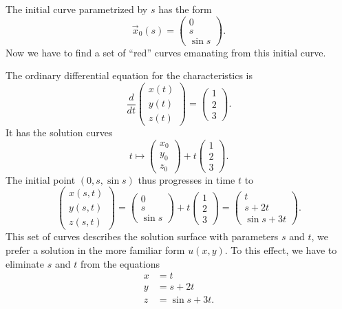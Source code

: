 The initial curve parametrized by $s$ has the form
\[
\vec x_0(s)
=
\begin{pmatrix}
0\\s\\\sin s
\end{pmatrix}.
\]
Now we have to find a set of ``red'' curves emanating from this 
initial curve.

The ordinary differential equation for the characteristics is
\[
\frac{d}{dt}\begin{pmatrix}x(t)\\y(t)\\z(t)\end{pmatrix}
=
\begin{pmatrix}1\\2\\3\end{pmatrix}.
\]
It has the solution curves
\[
t\mapsto\begin{pmatrix}x_0\\y_0\\z_0\end{pmatrix}+t\begin{pmatrix}1\\2\\3\end{pmatrix}.
\]
The initial point
$(0,s,\sin s)$
thus progresses in time $t$ to
\[
\begin{pmatrix}
x(s,t)\\
y(s,t)\\
z(s,t)
\end{pmatrix}
=
\begin{pmatrix}0\\s\\\sin s\end{pmatrix}+t\begin{pmatrix}1\\2\\3\end{pmatrix}
=
\begin{pmatrix}
t\\
s+2t\\
\sin s+3t
\end{pmatrix}.
\]
This set of curves describes the solution surface with parameters $s$ and $t$,
we prefer a solution in the more familiar form $u(x,y)$.
To this effect, we have to eliminate $s$ and $t$ from the equations
\begin{align*}
x&=t\\
y&=s+2t\\
z&=\sin s+3t.
\end{align*}
